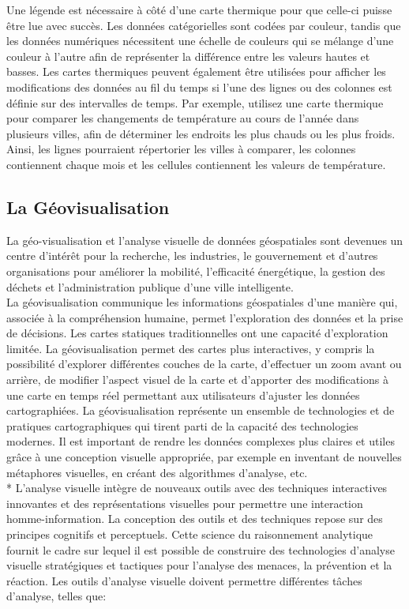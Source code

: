 \documentclass[french, a4paper, 12pt]{report}
\begin{document}
Une légende est nécessaire à côté d’une carte thermique pour que celle-ci puisse être lue avec succès. Les données catégorielles sont codées par couleur, tandis que les données numériques nécessitent une échelle de couleurs qui se mélange d'une couleur à l'autre afin de représenter la différence entre les valeurs hautes et basses. 
Les cartes thermiques peuvent également être utilisées pour afficher les modifications des données au fil du temps si l'une des lignes ou des colonnes est définie sur des intervalles de temps. Par exemple, utilisez une carte thermique pour comparer les changements de température au cours de l’année dans plusieurs villes, afin de déterminer les endroits les plus chauds ou les plus froids. Ainsi, les lignes pourraient répertorier les villes à comparer, les colonnes contiennent chaque mois et les cellules contiennent les valeurs de température.


\subsection{La Géovisualisation}
La géo-visualisation et l'analyse visuelle de données géospatiales sont devenues un centre d'intérêt pour la recherche, les industries, le gouvernement et d'autres organisations pour améliorer la mobilité, l'efficacité énergétique, la gestion des déchets et l'administration publique d'une ville intelligente.\\

La géovisualisation communique les informations géospatiales d'une manière qui, associée à la compréhension humaine, permet l'exploration des données et la prise de décisions. Les cartes statiques traditionnelles ont une capacité d'exploration limitée. La géovisualisation permet des cartes plus interactives, y compris la possibilité d'explorer différentes couches de la carte, d'effectuer un zoom avant ou arrière, de modifier l'aspect visuel de la carte et d’apporter des modifications à une carte en temps réel permettant aux utilisateurs d’ajuster les données cartographiées. La géovisualisation représente un ensemble de technologies et de pratiques cartographiques qui tirent parti de la capacité des technologies modernes. Il est important de rendre les données complexes plus claires et utiles grâce à une conception visuelle appropriée, par exemple en inventant de nouvelles métaphores visuelles, en créant des algorithmes d'analyse, etc. \\*
L'analyse visuelle intègre de nouveaux outils avec des techniques interactives innovantes et des représentations visuelles pour permettre une interaction homme-information. La conception des outils et des techniques repose sur des principes cognitifs et perceptuels. Cette science du raisonnement analytique fournit le cadre sur lequel il est possible de construire des technologies d'analyse visuelle stratégiques et tactiques pour l'analyse des menaces, la prévention et la réaction.
Les outils d'analyse visuelle doivent permettre différentes tâches d'analyse, telles que:
\end{document}
